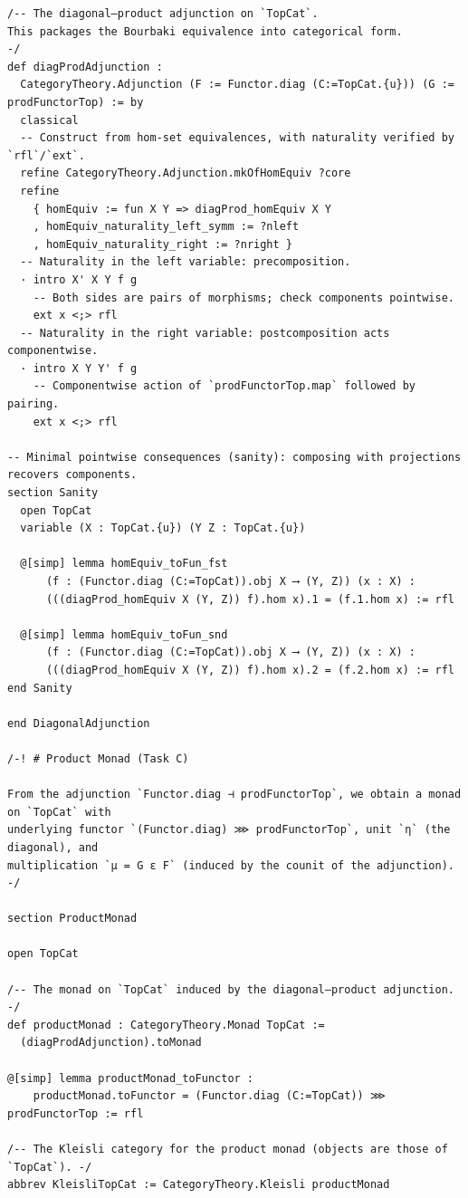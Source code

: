 \documentclass[12pt]{article}
\begin{document}
\begin{lstlisting}
/-- The diagonal–product adjunction on `TopCat`.
This packages the Bourbaki equivalence into categorical form.
-/
def diagProdAdjunction :
  CategoryTheory.Adjunction (F := Functor.diag (C:=TopCat.{u})) (G := prodFunctorTop) := by
  classical
  -- Construct from hom-set equivalences, with naturality verified by `rfl`/`ext`.
  refine CategoryTheory.Adjunction.mkOfHomEquiv ?core
  refine
    { homEquiv := fun X Y => diagProd_homEquiv X Y
    , homEquiv_naturality_left_symm := ?nleft
    , homEquiv_naturality_right := ?nright }
  -- Naturality in the left variable: precomposition.
  · intro X' X Y f g
    -- Both sides are pairs of morphisms; check components pointwise.
    ext x <;> rfl
  -- Naturality in the right variable: postcomposition acts componentwise.
  · intro X Y Y' f g
    -- Componentwise action of `prodFunctorTop.map` followed by pairing.
    ext x <;> rfl

-- Minimal pointwise consequences (sanity): composing with projections recovers components.
section Sanity
  open TopCat
  variable (X : TopCat.{u}) (Y Z : TopCat.{u})

  @[simp] lemma homEquiv_toFun_fst
      (f : (Functor.diag (C:=TopCat)).obj X ⟶ (Y, Z)) (x : X) :
      (((diagProd_homEquiv X (Y, Z)) f).hom x).1 = (f.1.hom x) := rfl

  @[simp] lemma homEquiv_toFun_snd
      (f : (Functor.diag (C:=TopCat)).obj X ⟶ (Y, Z)) (x : X) :
      (((diagProd_homEquiv X (Y, Z)) f).hom x).2 = (f.2.hom x) := rfl
end Sanity

end DiagonalAdjunction

/-! # Product Monad (Task C)

From the adjunction `Functor.diag ⊣ prodFunctorTop`, we obtain a monad on `TopCat` with
underlying functor `(Functor.diag) ⋙ prodFunctorTop`, unit `η` (the diagonal), and
multiplication `μ = G ε F` (induced by the counit of the adjunction).
-/

section ProductMonad

open TopCat

/-- The monad on `TopCat` induced by the diagonal–product adjunction. -/
def productMonad : CategoryTheory.Monad TopCat :=
  (diagProdAdjunction).toMonad

@[simp] lemma productMonad_toFunctor :
    productMonad.toFunctor = (Functor.diag (C:=TopCat)) ⋙ prodFunctorTop := rfl

/-- The Kleisli category for the product monad (objects are those of `TopCat`). -/
abbrev KleisliTopCat := CategoryTheory.Kleisli productMonad


\end{lstlisting}
\end{document}
